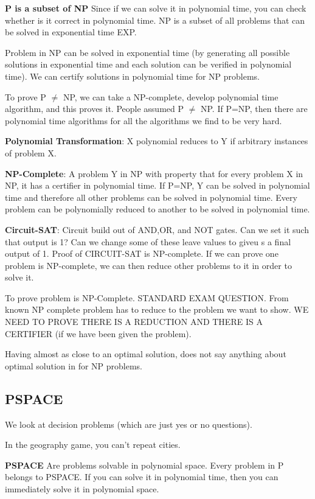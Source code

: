 \documentclass[11pt, oneside]{article}
\theoremstyle{definition}
\begin{document}
\textbf{P is a subset of NP}
Since if we can solve it in polynomial time, you can check whether is it correct in polynomial time. NP is a subset of all problems that can be solved in exponential time EXP.

Problem in NP can be solved in exponential time (by generating all possible solutions in exponential time and each solution can be verified in polynomial time). We can certify solutions in polynomial time for NP problems.

To prove P $\neq$ NP, we can take a NP-complete, develop polynomial time algorithm, and this proves it. People assumed P $\neq$ NP. If P=NP, then there are polynomial time algorithms for all the algorithms we find to be very hard.

\textbf{Polynomial Transformation}: X polynomial reduces to Y if arbitrary instances of problem X.

\textbf{NP-Complete}: A problem Y in NP with property that for every problem X in NP, it has a certifier in polynomial time. If P=NP, Y can be solved in polynomial time and therefore all other problems can be solved in polynomial time. Every problem can be polynomially reduced to another to be solved in polynomial time.

\textbf{Circuit-SAT}: Circuit build out of AND,OR, and NOT gates. Can we set it such that output is 1? Can we change some of these leave values to giveu s a final output of 1. Proof of CIRCUIT-SAT is NP-complete. If we can prove one problem is NP-complete, we can then reduce other problems to it in order to solve it.

To prove problem is NP-Complete. STANDARD EXAM QUESTION. From known NP complete problem has to reduce to the problem we want to show. WE NEED TO PROVE THERE IS A REDUCTION AND THERE IS A CERTIFIER (if we have been given the problem).

Having almost as close to an optimal solution, does not say anything about optimal solution in for NP problems.


\subsection{PSPACE}
We look at decision problems (which are just yes or no questions).

In the geography game, you can't repeat cities.

\textbf{PSPACE} Are problems solvable in polynomial space. Every problem in P belongs to PSPACE. If you can solve it in polynomial time, then you can immediately solve it in polynomial space.
\end{document}
